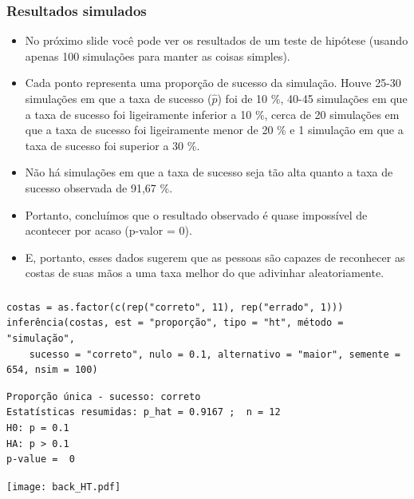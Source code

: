 \documentclass[11pt]{beamer}
\begin{document}
\begin{frame}
\frametitle{Resultados simulados}

\begin{itemize}

\item No próximo slide você pode ver os resultados de um teste de hipótese (usando apenas 100 simulações para manter as coisas simples).

\item Cada ponto representa uma proporção de sucesso da simulação. Houve 25-30 simulações em que a taxa de sucesso ($ \hat {p} $) foi de 10 \%, 40-45 simulações em que a taxa de sucesso foi ligeiramente inferior a 10 \%, cerca de 20 simulações em que a taxa de sucesso foi ligeiramente menor de 20 \% e 1 simulação em que a taxa de sucesso foi superior a 30 \%.

\item Não há simulações em que a taxa de sucesso seja tão alta quanto a taxa de sucesso observada de 91,67 \%.

\item Portanto, concluímos que o resultado observado é quase impossível de acontecer por acaso (p-valor = 0).

\item E, portanto, esses dados sugerem que as pessoas são capazes de reconhecer as costas de suas mãos a uma taxa melhor do que adivinhar aleatoriamente.

\end{itemize}

\end{frame}


\begin{frame}[fragile]
\frametitle{}

{\tiny
\begin{Verbatim}[frame=single, formatcom=\color{blue}]
costas = as.factor(c(rep("correto", 11), rep("errado", 1))) 
inferência(costas, est = "proporção", tipo = "ht", método = "simulação",
	sucesso = "correto", nulo = 0.1, alternativo = "maior", semente = 654, nsim = 100)
\end{Verbatim}
}

\pause

{\tiny
\begin{Verbatim}[frame=single, formatcom=\color{gray}]
Proporção única - sucesso: correto 
Estatísticas resumidas: p_hat = 0.9167 ;  n = 12 
H0: p = 0.1 
HA: p > 0.1 
p-value =  0 
\end{Verbatim}
}

\centering
\texttt{[image: back\_HT.pdf]}

\end{frame}

\end{document}
